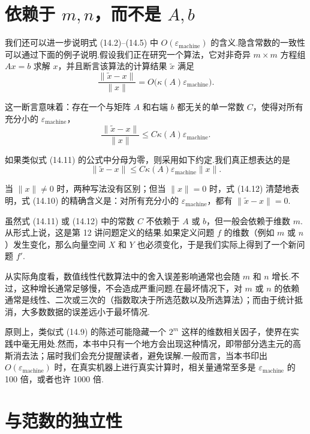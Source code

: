 \documentclass[UTF8,fontset=none,12pt]{ctexart}
\newcommand{\epsmach}{\varepsilon_{\mathrm{machine}}}
\theoremstyle{definition}
\begin{document}
\section*{依赖于 $m,n$，而不是 $A,b$}

我们还可以进一步说明式 (14.2)--(14.5) 中 $O(\epsmach)$ 的含义.隐含常数的一致性可以通过下面的例子说明.假设我们正在研究一个算法，它对非奇异 $m\times m$ 方程组 $Ax=b$ 求解 $x$，并且断言该算法的计算结果 $\widetilde x$ 满足
\begin{equation}
    \frac{\|\widetilde x-x\|}{\|x\|}
    =O\bigl(\kappa(A)\epsmach\bigr).
    \tag{14.10}
\end{equation}

这一断言意味着：存在一个与矩阵 $A$ 和右端 $b$ 都无关的单一常数 $C$，使得对所有充分小的 $\epsmach$，
\begin{equation}
    \frac{\|\widetilde x-x\|}{\|x\|}
    \le C\kappa(A)\epsmach.
    \tag{14.11}
\end{equation}

如果类似式 (14.11) 的公式中分母为零，则采用如下约定.我们真正想表达的是
\begin{equation}
    \|\widetilde x-x\|
    \le C\kappa(A)\epsmach\|x\|.
    \tag{14.12}
\end{equation}

当 $\|x\|\ne0$ 时，两种写法没有区别；但当 $\|x\|=0$ 时，式 (14.12) 清楚地表明，式 (14.10) 的精确含义是：对所有充分小的 $\epsmach$，都有 $\|\widetilde x-x\|=0$.

虽然式 (14.11) 或 (14.12) 中的常数 $C$ 不依赖于 $A$ 或 $b$，但一般会依赖于维数 $m$.从形式上说，这是第 12 讲问题定义的结果.如果定义问题 $f$ 的维数（例如 $m$ 或 $n$）发生变化，那么向量空间 $X$ 和 $Y$ 也必须变化，于是我们实际上得到了一个新问题 $f'$.

从实际角度看，数值线性代数算法中的舍入误差影响通常也会随 $m$ 和 $n$ 增长.不过，这种增长通常足够慢，不会造成严重问题.在最坏情况下，对 $m$ 或 $n$ 的依赖通常是线性、二次或三次的（指数取决于所选范数以及所选算法）；而由于统计抵消，大多数数据的误差远小于最坏情况.

原则上，类似式 (14.9) 的陈述可能隐藏一个 $2^m$ 这样的维数相关因子，使界在实践中毫无用处.然而，本书中只有一个地方会出现这种情况，即带部分选主元的高斯消去法；届时我们会充分提醒读者，避免误解.一般而言，当本书印出 $O(\epsmach)$ 时，在真实机器上进行真实计算时，相关量通常至多是 $\epsmach$ 的 100 倍，或者也许 1000 倍.

\section*{与范数的独立性}
\end{document}

